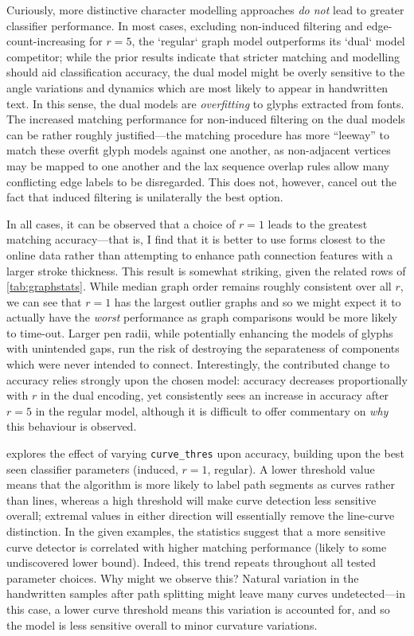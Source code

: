 \documentclass{mpaper}
\begin{document}
Curiously, more distinctive character modelling approaches \emph{do not} lead to greater classifier performance.
In most cases, excluding non-induced filtering and edge-count-increasing for $r=5$, the `regular` graph model outperforms its `dual` model competitor; while the prior results indicate that stricter matching and modelling should aid classification accuracy, the dual model might be overly sensitive to the angle variations and dynamics which are most likely to appear in handwritten text.
In this sense, the dual models are \emph{overfitting} to glyphs extracted from fonts.
The increased matching performance for non-induced filtering on the dual models can be rather roughly justified---the matching procedure has more ``leeway'' to match these overfit glyph models against one another, as non-adjacent vertices may be mapped to one another and the lax sequence overlap rules allow many conflicting edge labels to be disregarded.
This does not, however, cancel out the fact that induced filtering is unilaterally the best option.

In all cases, it can be observed that a choice of $r=1$ leads to the greatest matching accuracy---that is, I find that it is better to use forms closest to the online data rather than attempting to enhance path connection features with a larger stroke thickness.
This result is somewhat striking, given the related rows of \cref{tab:graphstats}.
While median graph order remains roughly consistent over all $r$, we can see that $r=1$ has the largest outlier graphs and so we might expect it to actually have the \emph{worst} performance as graph comparisons would be more likely to time-out.
Larger pen radii, while potentially enhancing the models of glyphs with unintended gaps, run the risk of destroying the separateness of components which were never intended to connect.
Interestingly, the contributed change to accuracy relies strongly upon the chosen model: accuracy decreases proportionally with $r$ in the dual encoding, yet consistently sees an increase in accuracy after $r=5$ in the regular model, although it is difficult to offer commentary on \emph{why} this behaviour is observed.

 explores the effect of varying \texttt{curve\_thres} upon accuracy, building upon the best seen classifier parameters (induced, $r=1$, regular).
A lower threshold value means that the algorithm is more likely to label path segments as curves rather than lines, whereas a high threshold will make curve detection less sensitive overall; extremal values in either direction will essentially remove the line-curve distinction.
In the given examples, the statistics suggest that a more sensitive curve detector is correlated with higher matching performance (likely to some undiscovered lower bound).
Indeed, this trend repeats throughout all tested parameter choices.
Why might we observe this?
Natural variation in the handwritten samples after path splitting might leave many curves undetected---in this case, a lower curve threshold means this variation is accounted for, and so the model is less sensitive overall to minor curvature variations.
\end{document}
